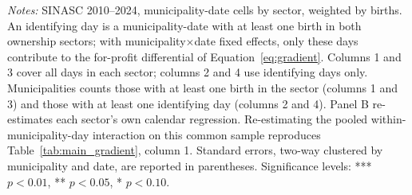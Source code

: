 \begin{table}[H]
\centering
\caption{\textbf{Coverage of the identifying municipality-days}}
\label{tab:ident_sample}
\small\setlength{\tabcolsep}{5pt}
\begin{minipage}{\linewidth}\footnotesize
\textit{Notes:} SINASC 2010--2024, municipality-date cells by sector, weighted by births. An identifying day is a municipality-date with at least one birth in both ownership sectors; with municipality$\times$date fixed effects, only these days contribute to the for-profit differential of Equation~\eqref{eq:gradient}. Columns 1 and 3 cover all days in each sector; columns 2 and 4 use identifying days only. Municipalities counts those with at least one birth in the sector (columns 1 and 3) and those with at least one identifying day (columns 2 and 4). Panel B re-estimates each sector's own calendar regression. Re-estimating the pooled within-municipality-day interaction on this common sample reproduces Table~\ref{tab:main_gradient}, column 1. Standard errors, two-way clustered by municipality and date, are reported in parentheses.
\newline
\footnotesize Significance levels: *** $p<0.01$, ** $p<0.05$, * $p<0.10$.
\end{minipage}
\end{table}
